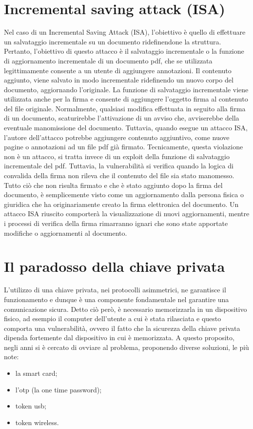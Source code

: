 \section{Incremental saving attack (ISA)}
Nel caso di un Incremental Saving Attack (ISA), l'obiettivo è quello di effettuare un salvataggio incrementale su un documento ridefinendone la struttura. Pertanto, l'obiettivo di questo attacco è il salvataggio incrementale o la funzione di aggiornamento incrementale di un documento pdf, che se utilizzata legittimamente consente a un utente di aggiungere annotazioni. Il contenuto aggiunto, viene salvato in modo incrementale ridefinendo un nuovo corpo del documento, aggiornando l'originale. La funzione di salvataggio incrementale viene utilizzata anche per la firma e consente di aggiungere l'oggetto firma al contenuto del file originale. Normalmente, qualsiasi modifica effettuata in seguito alla firma di un documento, scaturirebbe l'attivazione di un avviso che, avviserebbe della eventuale manomissione del documento. Tuttavia, quando esegue un attacco ISA, l'autore dell'attacco potrebbe aggiungere contenuto aggiuntivo, come nuove pagine o annotazioni ad un file pdf già firmato. Tecnicamente, questa violazione non è un attacco, si tratta invece di un exploit della funzione di salvataggio incrementale del pdf. Tuttavia, la vulnerabilità si verifica quando la logica di convalida della firma non rileva che il contenuto del file sia stato manomesso. Tutto ciò che non risulta firmato e che è stato aggiunto dopo la firma del documento, è semplicemente visto come un aggiornamento dalla persona fisica o giuridica che ha originariamente creato la firma elettronica del documento. Un attacco ISA riuscito comporterà la visualizzazione di nuovi aggiornamenti, mentre i processi di verifica della firma rimarranno ignari che sono state apportate modifiche o aggiornamenti al documento.


\section{Il paradosso della chiave privata}

L'utilizzo di una chiave privata, nei protocolli asimmetrici, ne garantisce il funzionamento e dunque è una componente fondamentale nel garantire una comunicazione sicura. Detto ciò però, è necessario memorizzarla in un dispositivo fisico, ad esempio il computer dell'utente a cui è stata rilasciata e questo comporta una vulnerabilità, ovvero il fatto che la sicurezza della chiave privata dipenda fortemente dal dispositivo in cui è memorizzata. A questo proposito, negli anni si è cercato di ovviare al problema, proponendo diverse soluzioni, le più note:
\begin{itemize}
	\item la smart card;
	\item l'otp (la one time password);
	\item token usb;
	\item token wireless.
\end{itemize}


